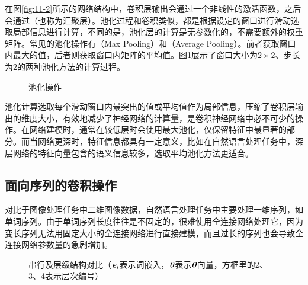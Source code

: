 \parinterval 在图\ref{fig:11-2}所示的网络结构中，卷积层输出会通过一个非线性的激活函数，之后会通过{\small{}}（也称为汇聚层）。池化过程和卷积类似，都是根据设定的窗口进行滑动选取局部信息进行计算，不同的是，池化层的计算是无参数化的，不需要额外的权重矩阵。常见的池化操作有{\small{}}（Max Pooling）和{\small{}}（Average Pooling）。前者获取窗口内最大的值，后者则获取窗口内矩阵的平均值。图\ref{fig:11-8}展示了窗口大小为$2 \times 2$、步长为2的两种池化方法的计算过程。
\vspace{-0.8em}

\begin{figure}[htp]
\centering
%
\subfigure[最大池化]{}
\subfigure[平均池化]{}
\caption{池化操作}
\label{fig:11-8}
\end{figure}
\vspace{-1em}
\parinterval 池化计算选取每个滑动窗口内最突出的值或平均值作为局部信息，压缩了卷积层输出的维度大小，有效地减少了神经网络的计算量，是卷积神经网络中必不可少的操作。在网络建模时，通常在较低层时会使用最大池化，仅保留特征中最显著的部分。而当网络更深时，特征信息都具有一定意义，比如在自然语言处理任务中，深层网络的特征向量包含的语义信息较多，选取平均池化方法更适合。



\subsection{面向序列的卷积操作}

\parinterval 对比于图像处理任务中二维图像数据，自然语言处理任务中主要处理一维序列，如单词序列。由于单词序列长度往往是不固定的，很难使用全连接网络处理它，因为变长序列无法用固定大小的全连接网络进行直接建模，而且过长的序列也会导致全连接网络参数量的急剧增加。

\begin{figure}[htp]
\centering
%
\subfigure[循环神经网络的串行结构]{}
\subfigure[卷积神经网络的层级结构]{}
\caption{串行及层级结构对比（$\textbf{\em e}_i$表示词嵌入，$\textbf{\em 0}$表示$\textbf{\em 0}$向量，方框里的2、3、4表示层次编号）}
\label{fig:11-9}
\end{figure}

